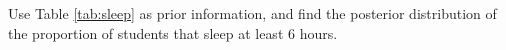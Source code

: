 \begin{enumerate}
\begin{table}[!htbp]
\begin{tabular}{cccccccccccc}
	\end{tabular}
\end{table}
Use Table \ref{tab:sleep} as prior information, and find the posterior distribution of the proportion of students that sleep at least 6 hours. 
	

\end{enumerate}



